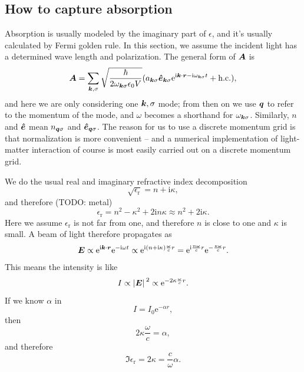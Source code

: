 \documentclass[hyperref, a4paper]{report}
\newcommand*{\ii}{\mathrm{i}}
\newcommand*{\ee}{\mathrm{e}}
\newcommand*{\epsr}{\epsilon_{\text{r}}}
\begin{document}
\subsection{How to capture absorption}

Absorption is usually modeled by the imaginary part of $\epsilon$,
and it's usually calculated by Fermi golden rule.
In this section, we assume the incident light 
has a determined wave length and polarization.
The general form of $\vb*{A}$ is 
\begin{equation}
    \vb*{A} = \sum_{\vb*{k}, \sigma}
        \sqrt{\frac{\hbar}{2 \omega_{\vb*{k} \sigma} \epsilon_0 V}}
        (
            a_{\vb*{k} \sigma} \vu*{e}_{\vb*{k} \sigma} 
            \ee^{\ii \vb*{k} \cdot \vb*{r} - \ii \omega_{\vb*{k} \sigma} t}
            + \text{h.c.}
        ),
\end{equation}
and here we are only considering one $\vb*{k}, \sigma$ mode; 
from then on we use $\vb*{q}$ to refer to the momentum of the mode,
and $\omega$ becomes a shorthand for $\omega_{\vb*{k} \sigma}$.
Similarly, $n$ and $\vu*{e}$ mean 
$n_{\vb*{q} \sigma}$ and $\vu*{e}_{\vb*{q} \sigma}$.
The reason for us to use a discrete momentum grid 
is that normalization is more convenient -- 
and a numerical implementation of light-matter interaction
of course is most easily carried out 
on a discrete momentum grid.

We do the usual real and imaginary refractive index decomposition
\begin{equation}
    \sqrt{\epsr} = n + \ii \kappa,
\end{equation}
and therefore (TODO: metal)
\begin{equation}
    \epsr = n^2 - \kappa^2 + 2 \ii n \kappa 
    \approx n^2 + 2 \ii \kappa.
\end{equation}
Here we assume $\epsr$ is not far from one, 
and therefore $n$ is close to one and $\kappa$ is small.
A beam of light therefore propagates as 
\[
    \vb*{E} \propto \ee^{\ii \vb*{k} \cdot \vb*{r}} \ee^{- \ii \omega t}
    \propto \ee^{\ii (n + \ii \kappa) \frac{\omega}{c} r} 
    = \ee^{\ii \frac{n \omega}{c} r} \ee^{- \frac{\kappa \omega}{c} r}.
\]
This means the intensity is like 
\[
    I \propto \abs*{\vb*{E}}^2 \propto \ee^{- 2 \kappa \frac{\omega}{c} r}.
\]
If we know $\alpha$  in
\begin{equation}
    I = I_0 \ee^{- \alpha r}, 
    \label{eq:light-matter.decay}
\end{equation}
then 
\[
    2 \kappa \frac{\omega}{c} = \alpha,
\]
and therefore 
\begin{equation}
    \Im \epsr = 2 \kappa = \frac{c}{\omega} \alpha.
\end{equation}
\end{document}
